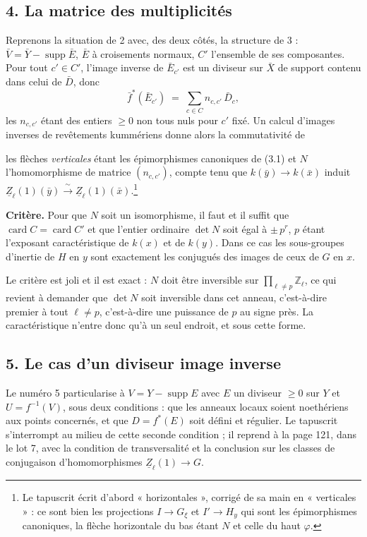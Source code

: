 \documentclass[11pt,a4paper]{article}
\begin{document}
\subsection*{4. La matrice des multiplicités}

Reprenons la situation de 2 avec, des deux côtés, la structure de 3 :
$\bar{V} = \bar{Y} - \operatorname{supp}\bar{E}$, $\bar{E}$ à croisements
normaux, $C'$ l'ensemble de ses composantes. Pour tout $c' \in C'$, l'image
inverse de $\bar{E}_{c'}$ est un diviseur sur $\bar{X}$ de support contenu dans
celui de $\bar{D}$, donc
\[
  \bar{f}^{*}(\bar{E}_{c'}) \;=\; \sum_{c \in C} n_{c,c'}\,\bar{D}_{c} ,
\]
les $n_{c,c'}$ étant des entiers $\geqslant 0$ non tous nuls pour $c'$ fixé.
Un calcul d'images inverses de revêtements kummériens donne alors la
commutativité de


les flèches \emph{verticales} étant les épimorphismes canoniques de (3.1) et
$N$ l'homomorphisme de matrice $(n_{c,c'})$, compte tenu que
$k(\bar{y}) \to k(\bar{x})$ induit
$\underline{Z}_{\ell}(1)(\bar{y}) \xrightarrow{\ \sim\ }
\underline{Z}_{\ell}(1)(\bar{x})$.\footnote{Le tapuscrit écrit d'abord
« horizontales », corrigé de sa main en « verticales » : ce sont bien les
projections $I \to G_{\xi}$ et $I' \to H_{y}$ qui sont les épimorphismes
canoniques, la flèche horizontale du bas étant $N$ et celle du haut $\varphi$.}

\textbf{Critère.} Pour que $N$ soit un isomorphisme, il faut et il suffit que
$\operatorname{card} C = \operatorname{card} C'$ et que l'entier ordinaire
$\det N$ soit égal à $\pm\, p^{r}$, $p$ étant l'exposant caractéristique de
$k(x)$ et de $k(y)$. Dans ce cas les sous-groupes d'inertie de $H$ en $y$ sont
exactement les conjugués des images de ceux de $G$ en $x$.

Le critère est joli et il est exact : $N$ doit être inversible sur
$\prod_{\ell \neq p}\mathbb{Z}_{\ell}$, ce qui revient à demander que $\det N$
soit inversible dans cet anneau, c'est-à-dire premier à tout $\ell \neq p$,
c'est-à-dire une puissance de $p$ au signe près. La caractéristique n'entre
donc qu'à un seul endroit, et sous cette forme.

\subsection*{5. Le cas d'un diviseur image inverse}

Le numéro 5 particularise à $V = Y - \operatorname{supp} E$ avec $E$ un
diviseur $\geqslant 0$ sur $Y$ et $U = f^{-1}(V)$, sous deux conditions : que
les anneaux locaux soient noethériens aux points concernés, et que
$D = f^{*}(E)$ soit défini et régulier. Le tapuscrit s'interrompt au milieu de
cette seconde condition ; il reprend à la page 121, dans le lot 7, avec la
condition de transversalité et la conclusion sur les classes de conjugaison
d'homomorphismes $\underline{Z}_{\ell}(1) \to G$.
\end{document}
